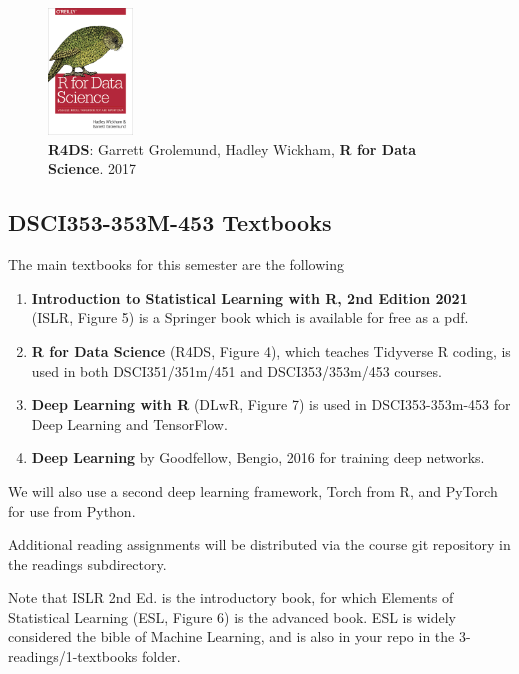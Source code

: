 \documentclass[10pt]{article} %
\begin{document}
    \begin{figure}
      \centering
      \caption{{\bf R4DS}: Garrett Grolemund, Hadley Wickham, {\bf R for Data Science}. 2017 \cite{wickham_r_2017}}
      \includegraphics[width=0.2\textwidth]{r4ds} %
    \end{figure}


 \FloatBarrier

  \subsection{DSCI353-353M-453 Textbooks}

    The main textbooks for this semester are the following

    \begin{enumerate}
      \item \textbf{Introduction to Statistical Learning with R, 2nd Edition 2021} (ISLR, Figure 5) is a Springer book which is available for free as a pdf.
      \item \textbf{R for Data Science} (R4DS, Figure 4), which teaches Tidyverse R coding, is used in both DSCI351/351m/451 and DSCI353/353m/453 courses.
      \item \textbf{Deep Learning with R} (DLwR, Figure 7) is used in DSCI353-353m-453 for Deep Learning and TensorFlow.
      \item \textbf{Deep Learning} by Goodfellow, Bengio, 2016 for training deep networks.
    \end{enumerate}

    We will also use a second deep learning framework, Torch from R, and PyTorch for use from Python.

    Additional reading assignments will be distributed via the course git repository in the readings subdirectory.

    Note that ISLR 2nd Ed. is the introductory book, for which Elements of Statistical Learning (ESL, Figure 6) is the advanced book.
    ESL is widely considered the bible of Machine Learning, and is also in your repo in the 3-readings/1-textbooks folder.
\end{document}

